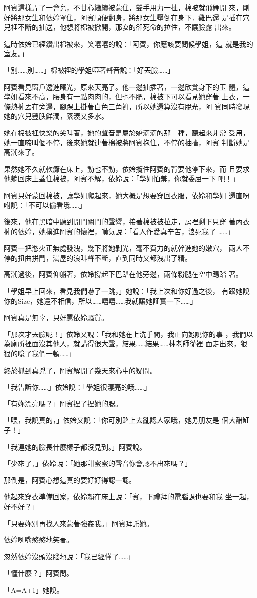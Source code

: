 阿賓這樣弄了一會兒，不甘心繼續被蒙住，雙手用力一扯，棉被就飛舞開
來，剛好將那女生和依姈罩住，阿賓順便翻身，將那女生壓倒在身下，雞巴還
是插在穴兒裡不斷的抽送，他想將棉被掀開，那女的卻死命的拉住，不讓臉露
出來。

這時依姈已經鑽出棉被來，笑嘻嘻的說：「阿賓，你應該要問候學姐，這
就是我的室友。」

「別……別……」棉被裡的學姐啞著聲音說：「好丟臉……」

阿賓看見窗戶透進曙光，原來天亮了。他一邊抽插著，一邊欣賞身下的玉
體，這學姐看來不高，腰身有一點肉肉的，但也不肥，棉被下可以看見她穿著
上衣，一條熱褲丟在旁邊，腳踝上掛著白色三角褲，所以她還算沒有脫光，阿
賓同時發現她的穴兒豐腴鮮潤，緊湊又多水。

她在棉被裡快樂的尖叫著，她的聲音是屬於嬌滴滴的那一種，聽起來非常
受用，她一直啼叫個不停，後來她就連著棉被將阿賓抱住，不停的抽搐，阿賓
判斷她是高潮來了。

果然她不久就軟癱在床上，動也不動，依姈攬住阿賓的背要他停下來，而
且要求他躺回床上蓋住棉被，阿賓不解，依姈說：「學姐怕羞，你就委屈一下
吧！」

阿賓只好蒙回棉被，讓學姐爬起來，她大概是想要穿回衣服，依姈和學姐
還直吩咐說：「不可以偷看哦……」

後來，他在黑暗中聽到開門關門的聲響，接著棉被被拉走，房裡剩下只穿
著內衣褲的依姈，她撲進阿賓的懷裡，嘆氣說：「看人作愛真辛苦，浪死我了
……」

阿賓一把慾火正無處發洩，幾下將她剝光，毫不費力的就幹進她的嫩穴，
兩人不停的扭曲拼鬥，滿屋的浪叫聲不斷，直到同時又都洩出了精。

高潮過後，阿賓仰躺著，依姈撐起下巴趴在他旁邊，兩條粉腿在空中踢踏
著。

「學姐早上回來，看見我們嚇了一跳，」她說：「我上次和你好過之後，
有跟她說你的Size，她還不相信，所以……嘻嘻……我就讓她証實一下……」

阿賓真是無辜，只好罵依姈騷貨。

「那次才丟臉呢！」依姈又說：「我和她在上洗手間，我正向她說你的事
，我們以為廁所裡面沒其他人，就講得很大聲，結果……結果……林老師從裡
面走出來，狠狠的唸了我們一頓……」

終於抓到真兇了，阿賓解開了幾天來心中的疑問。

「我告訴你……」依姈說：「學姐很漂亮的哦……」

「有妳漂亮嗎？」阿賓捏了捏她的腮。

「喂，我說真的，」依姈又說：「你可別路上去亂認人家哦，她男朋友是
個大醋缸子！」

「我連她的臉長什麼樣子都沒見到。」阿賓說。

「少來了，」依姈說：「她那甜蜜蜜的聲音你會認不出來嗎？」

那倒是，阿賓心想這真的要好好得認一認。

他起來穿衣準備回家，依姈賴在床上說：「賓，下禮拜的電腦課也要和我
坐一起，好不好？」

「只要妳別再找人來蒙著強姦我。」阿賓拜託她。

依姈咧嘴憨憨地笑著。

忽然依姈沒頭沒腦地說：「我已經懂了……」

「懂什麼？」阿賓問。

「A=A+1」她說。










